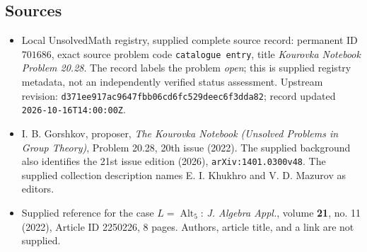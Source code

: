 \documentclass[11pt]{article}
\begin{document}
\subsection{Sources}
\begin{itemize}
\item Local UnsolvedMath registry, supplied complete source record: permanent ID \(701686\), exact source problem code \texttt{catalogue entry}, title \emph{Kourovka Notebook Problem 20.28}. The record labels the problem \emph{open}; this is supplied registry metadata, not an independently verified status assessment. Upstream revision: \texttt{d371ee917ac9647fbb06cd6fc529deec6f3dda82}; record updated \texttt{2026-10-16T14:00:00Z}.
\item I. B. Gorshkov, proposer, \emph{The Kourovka Notebook (Unsolved Problems in Group Theory)}, Problem 20.28, 20th issue (2022). The supplied background also identifies the 21st issue edition (2026), \texttt{arXiv:1401.0300v48}. The supplied collection description names E. I. Khukhro and V. D. Mazurov as editors.
\item Supplied reference for the case \(L=\operatorname{Alt}_5\): \emph{J. Algebra Appl.}, volume \textbf{21}, no. 11 (2022), Article ID 2250226, 8 pages. Authors, article title, and a link are not supplied.
\end{itemize}
\end{document}

